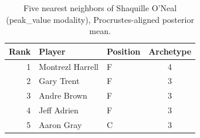 \begin{table}[htbp]
  \centering\small
  \begin{tabular}{rllc}
    \toprule
    Rank & Player & Position & Archetype \\
    \midrule
    1 & Montrezl Harrell & F & 4 \\
    2 & Gary Trent & F & 3 \\
    3 & Andre Brown & F & 3 \\
    4 & Jeff Adrien & F & 3 \\
    5 & Aaron Gray & C & 3 \\
    \bottomrule
  \end{tabular}
  \caption{Five nearest neighbors of Shaquille O'Neal (peak_value modality), Procrustes-aligned posterior mean.}
  \label{tab:Shaquille_O_Neal_neighbors_peak_value}
\end{table}

